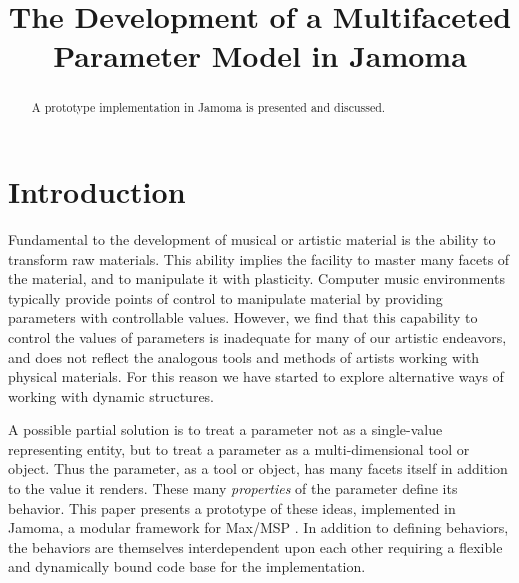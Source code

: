 \documentclass{article}
\title{The Development of a Multifaceted Parameter Model in Jamoma}
\begin{document}
%
\maketitle
%
\sloppy
\begin{abstract}

A prototype implementation in Jamoma is presented and discussed.


\end{abstract}


\section{Introduction} %
\label{sec:introduction}

Fundamental to the development of musical or artistic material is the ability to transform raw materials.  This ability implies the facility to master many facets of the material, and to manipulate it with plasticity.  Computer music environments typically provide points of control to manipulate material by providing parameters with controllable values. However, we find that this capability to control the values of parameters is inadequate for many of our artistic endeavors, and does not reflect the analogous tools and methods of artists working with physical materials. For this reason we have started to explore alternative ways of working with dynamic structures.

A possible partial solution is to treat a parameter not as a single-value representing entity, but to treat a parameter as a multi-dimensional tool or object.  Thus the parameter, as a tool or object, has many facets itself in addition to the value it renders.  These many \emph{properties} of the parameter define its behavior. This paper presents a prototype of these ideas, implemented in Jamoma, a modular framework for Max/MSP \cite{Place:2006}. In addition to defining behaviors, the behaviors are themselves interdependent upon each other requiring a flexible and dynamically bound code base for the implementation.
\end{document}
